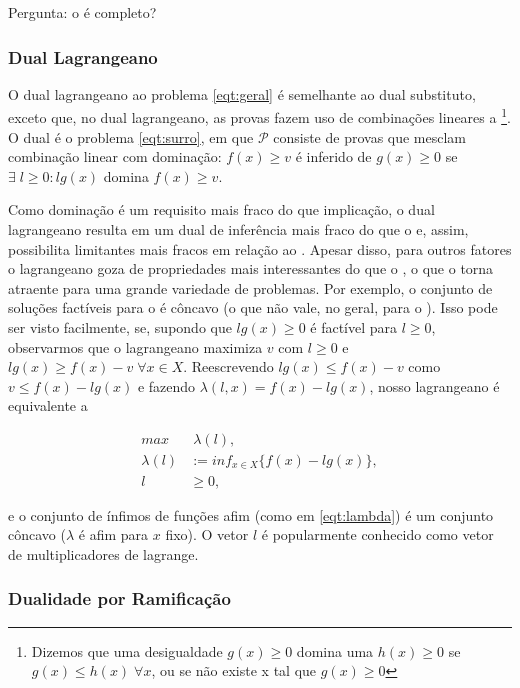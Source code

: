 \documentclass{article}
\begin{document}
Pergunta: o  é completo?


\subsubsection{Dual Lagrangeano}

O dual lagrangeano ao problema \ref{eqt:geral} é semelhante ao dual substituto, exceto que, no dual
lagrangeano, as provas fazem uso de combinações lineares a \footnote{Dizemos que uma
desigualdade $g(x) \geq 0$ domina uma $h(x) \geq 0$ se $g(x) \leq h(x) \;\forall x$, ou se não existe x
tal que $g(x) \geq 0$}. O dual é o problema \ref{eqt:surro}, em que $\mathcal{P}$ consiste de provas
que mesclam combinação linear com dominação: $f(x) \geq v$ é inferido de $g(x) \geq 0$ se $\exists
\; l \geq 0: lg(x)$ domina $f(x) \geq v$.

Como dominação é um requisito mais fraco do que implicação, o dual lagrangeano resulta em um dual de
inferência mais fraco do que o  e, assim, possibilita limitantes mais fracos
em relação ao . Apesar disso, para outros fatores o lagrangeano goza de propriedades mais
interessantes do que o , o que o torna atraente para uma grande variedade de problemas. Por exemplo,
o conjunto de soluções factíveis para o  é côncavo (o que não vale, no
geral, para o ). Isso pode ser visto
facilmente, se, supondo que $lg(x) \geq 0$ é factível para $l\geq0$, observarmos que o
lagrangeano maximiza $v$ com $l \geq 0$ e $lg(x) \geq f(x) - v \; \forall x \in X$. Reescrevendo $lg(x)
\leq f(x) - v$ como $v \leq f(x) - lg(x)$ e fazendo $\lambda(l,x) = f(x) - lg(x)$, nosso
lagrangeano é equivalente a

  \begin{align}
     max &\; \lambda(l),\\
     \lambda(l) &:=  inf_{x \in X}\{f(x) - lg(x)\},\label{eqt:lambda}\\
     l & \geq 0,
  \end{align}

\noindent e o conjunto de ínfimos de funções afim (como em \ref{eqt:lambda}) é um conjunto côncavo
($\lambda$ é afim para $x$ fixo). O vetor $l$ é popularmente conhecido como vetor de multiplicadores
de lagrange.

\subsubsection{Dualidade por Ramificação}
\end{document}
